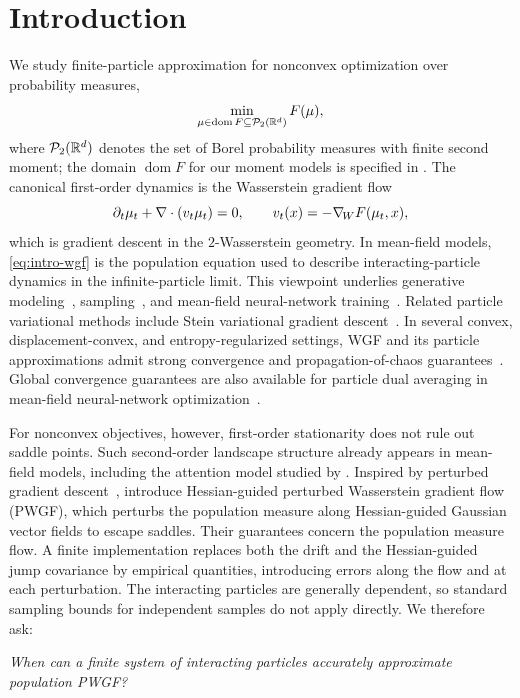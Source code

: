 \section{Introduction}
\label{sec:introduction}

We study finite-particle approximation for nonconvex optimization over probability measures,
\begin{equation}
    \min_{\mu\in\operatorname{dom}F\subseteq\mathcal P_2(\mathbb{R}^d)} F(\mu),
    \label{eq:measure-optimization}
\end{equation}
where \(\mathcal P_2(\mathbb{R}^d)\) denotes the set of Borel probability measures with finite second moment;
the domain \(\operatorname{dom}F\) for our moment models is specified in .
The canonical first-order dynamics is the Wasserstein gradient flow
\begin{equation}
    \partial_t \mu_t + \nabla\cdot(v_t\mu_t)=0,
    \qquad
    v_t(x)=-\nabla_{\!W} F(\mu_t,x),
    \label{eq:intro-wgf}
\end{equation}
which is gradient descent in the \(2\)-Wasserstein geometry.
In mean-field models, \eqref{eq:intro-wgf} is the population equation used to
describe interacting-particle dynamics in the infinite-particle limit.
This viewpoint underlies generative modeling~\citep{arbel2019,chu2019pfd},
sampling~\citep{jordan1998}, and mean-field neural-network
training~\citep{chizat2018,songmei2018,nitanda2022convex}.
Related particle variational methods include Stein variational
gradient descent~\citep{liu2016}.
In several convex, displacement-convex, and entropy-regularized settings,
WGF and its particle approximations admit strong convergence and propagation-of-chaos
\citep{sznitman1991} guarantees~\citep{chen2025uniform,
suzuki2023uniformintime,nitanda2025propagationensemble}.
Global convergence guarantees are also available for particle dual averaging
in mean-field neural-network optimization~\citep{nitanda2022pda}.

For nonconvex objectives, however, first-order stationarity does not rule out
saddle points. Such second-order landscape structure already appears in
mean-field models, including the attention model studied by
\citet{kim2024nonlinear}.
Inspired by perturbed gradient descent~\citep{GeHuangJinYuan2015,pmlr-v75-jin18a},
\citet{yamamoto2025hessianguided} introduce Hessian-guided perturbed Wasserstein
gradient flow (PWGF), which perturbs the population measure along
Hessian-guided Gaussian vector fields to escape saddles. Their guarantees
concern the population measure flow. A finite implementation replaces both the
drift and the Hessian-guided jump covariance by empirical quantities,
introducing errors along the flow and at each perturbation.
The interacting particles are generally dependent, so standard sampling bounds
for independent samples do not apply directly.
We therefore ask:
\begin{center}
\emph{When can a finite system of interacting particles accurately approximate population PWGF?}
\end{center}

